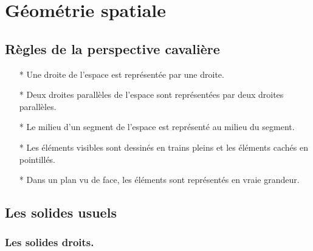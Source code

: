 \ifdefined\COMPLETE
\else
    
    
\fi

\section{Géométrie spatiale}

\subsection{Règles de la perspective cavalière}

\begin{itemize}
\item[*] Une droite de l'espace est représentée par une droite.
\item[*] Deux droites parallèles de l'espace sont représentées par deux droites parallèles.
\item[*] Le milieu d'un segment de l'espace est représenté au milieu du segment.
\item[*] Les éléments visibles sont dessinés en trains pleins et les éléments cachés en pointillés.
\item[*] Dans un plan vu de face, les éléments sont représentés en vraie grandeur.
\end{itemize}

\subsection{Les solides usuels}

\subsubsection{Les solides droits.}


